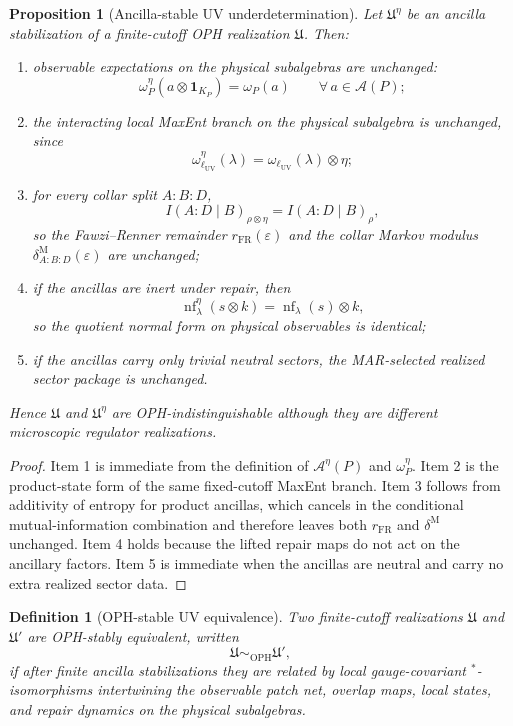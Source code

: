 \documentclass[11pt]{article}
\newtheorem{proposition}[theorem]{Proposition}
\newtheorem{definition}[theorem]{Definition}
\newcommand{\nf}{\operatorname{nf}}
\begin{document}
\begin{proposition}[Ancilla-stable UV underdetermination]\label{prop:ancillauv}
Let \(\mathfrak U^\eta\) be an ancilla stabilization of a finite-cutoff OPH realization \(\mathfrak U\). Then:
\begin{enumerate}[leftmargin=2em]
\item observable expectations on the physical subalgebras are unchanged:
\[
\omega_P^\eta(a\otimes \mathbf 1_{K_P})=\omega_P(a)
\qquad
\forall\, a\in\mathcal A(P);
\]
\item the interacting local MaxEnt branch on the physical subalgebra is unchanged, since
\[
\omega_{\ell_{\mathrm{UV}}}^\eta(\lambda)=\omega_{\ell_{\mathrm{UV}}}(\lambda)\otimes \eta;
\]
\item for every collar split \(A:B:D\),
\[
I(A:D\mid B)_{\rho\otimes \eta}=I(A:D\mid B)_\rho,
\]
so the Fawzi--Renner remainder \(r_{\mathrm{FR}}(\varepsilon)\) and the collar Markov modulus \(\delta^{\mathrm M}_{A:B:D}(\varepsilon)\) are unchanged;
\item if the ancillas are inert under repair, then
\[
\nf_\lambda^\eta(s\otimes k)=\nf_\lambda(s)\otimes k,
\]
so the quotient normal form on physical observables is identical;
\item if the ancillas carry only trivial neutral sectors, the MAR-selected realized sector package is unchanged.
\end{enumerate}
Hence \(\mathfrak U\) and \(\mathfrak U^\eta\) are OPH-indistinguishable although they are different microscopic regulator realizations.
\end{proposition}

\begin{proof}
Item 1 is immediate from the definition of \(\mathcal A^\eta(P)\) and \(\omega_P^\eta\). Item 2 is the product-state form of the same fixed-cutoff MaxEnt branch. Item 3 follows from additivity of entropy for product ancillas, which cancels in the conditional mutual-information combination and therefore leaves both \(r_{\mathrm{FR}}\) and \(\delta^{\mathrm M}\) unchanged. Item 4 holds because the lifted repair maps do not act on the ancillary factors. Item 5 is immediate when the ancillas are neutral and carry no extra realized sector data.
\end{proof}

\begin{definition}[OPH-stable UV equivalence]\label{def:ophuveq}
Two finite-cutoff realizations \(\mathfrak U\) and \(\mathfrak U'\) are \emph{OPH-stably equivalent}, written
\[
\mathfrak U\sim_{\mathrm{OPH}}\mathfrak U',
\]
if after finite ancilla stabilizations they are related by local gauge-covariant \(^*\)-isomorphisms intertwining the observable patch net, overlap maps, local states, and repair dynamics on the physical subalgebras.
\end{definition}
\end{document}
